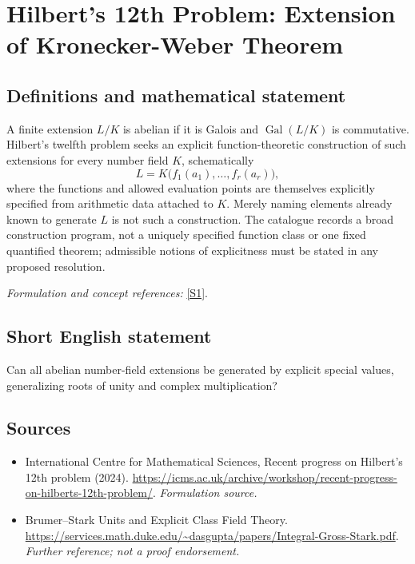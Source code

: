 \documentclass[11pt]{article}
\begin{document}
\section*{\texorpdfstring{Hilbert's 12th Problem: Extension of Kronecker-Weber Theorem}{Hilbert's 12th Problem: Extension of Kronecker-Weber Theorem}}\label{statement}
\subsection{Definitions and mathematical statement}
A finite extension $L/K$ is abelian if it is Galois and $\operatorname{Gal}(L/K)$ is commutative. Hilbert's twelfth problem seeks an explicit function-theoretic construction of such extensions for every number field $K$, schematically
\[
 L=K\bigl(f_1(a_1),\ldots,f_r(a_r)\bigr),
\]
where the functions and allowed evaluation points are themselves explicitly specified from arithmetic data attached to $K$. Merely naming elements already known to generate $L$ is not such a construction. The catalogue records a broad construction program, not a uniquely specified function class or one fixed quantified theorem; admissible notions of explicitness must be stated in any proposed resolution.
\par\smallskip\textit{Formulation and concept references:} \href{https://icms.ac.uk/archive/workshop/recent-progress-on-hilberts-12th-problem/}{[S1]}.

\subsection{Short English statement}
Can all abelian number-field extensions be generated by explicit special values, generalizing roots of unity and complex multiplication?
\subsection{Sources}
\begin{itemize}
\item[S1]International Centre for Mathematical Sciences, Recent progress on Hilbert's 12th problem (2024).
\url{https://icms.ac.uk/archive/workshop/recent-progress-on-hilberts-12th-problem/}.
\textit{Formulation source.}
\item[S2]Brumer–Stark Units and Explicit Class Field Theory.
\url{https://services.math.duke.edu/~dasgupta/papers/Integral-Gross-Stark.pdf}.
\textit{Further reference; not a proof endorsement.}
\end{itemize}
\end{document}
